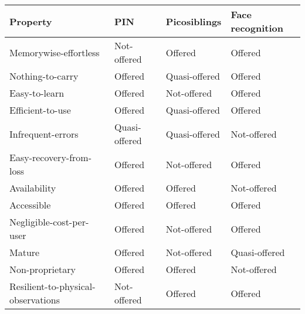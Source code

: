 \begin{table}
    \begin{tabular}{l|l|l|l}
    Property                            & PIN           					& Picosiblings  					& Face recognition \\ \hline
    Memorywise-effortless               & \cellcolor{red!25}Not-offered   	& \cellcolor{green!25}Offered       & \cellcolor{green!25}Offered          \\
    Nothing-to-carry                    & \cellcolor{green!25}Offered       & \cellcolor{yellow!25}Quasi-offered   & \cellcolor{green!25}Offered          \\
    Easy-to-learn                       & \cellcolor{green!25}Offered       & \cellcolor{red!25}Not-offered   & \cellcolor{green!25}Offered          \\
    Efficient-to-use                    & \cellcolor{green!25}Offered       & \cellcolor{yellow!25}Quasi-offered & \cellcolor{green!25}Offered          \\
    Infrequent-errors                   & \cellcolor{yellow!25}Quasi-offered & \cellcolor{yellow!25}Quasi-offered & \cellcolor{red!25}Not-offered      \\
    Easy-recovery-from-loss             & \cellcolor{green!25}Offered       & \cellcolor{red!25}Not-offered   & \cellcolor{green!25}Offered          \\
    Availability                        & \cellcolor{green!25}Offered       & \cellcolor{green!25}Offered       & \cellcolor{red!25}Not-offered      \\ \hline
    Accessible                          & \cellcolor{green!25}Offered       & \cellcolor{green!25}Offered       & \cellcolor{green!25}Offered          \\
    Negligible-cost-per-user            & \cellcolor{green!25}Offered       & \cellcolor{red!25}Not-offered   & \cellcolor{green!25}Offered          \\
    Mature                              & \cellcolor{green!25}Offered       & \cellcolor{red!25}Not-offered   & \cellcolor{yellow!25}Quasi-offered    \\
    Non-proprietary                     & \cellcolor{green!25}Offered       & \cellcolor{green!25}Offered       & \cellcolor{red!25}Not-offered      \\ \hline
    Resilient-to-physical-observations  & \cellcolor{red!25}Not-offered   & \cellcolor{green!25}Offered       & \cellcolor{green!25}Offered          \\

\end{tabular}
\end{table}
